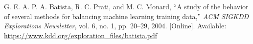 G. E. A. P. A. Batista, R. C. Prati, and M. C. Monard,
``A study of the behavior of several methods for balancing machine learning training data,''
\emph{ACM SIGKDD Explorations Newsletter}, vol. 6, no. 1, pp. 20--29, 2004.
[Online]. Available: \url{https://www.kdd.org/exploration_files/batista.pdf}

